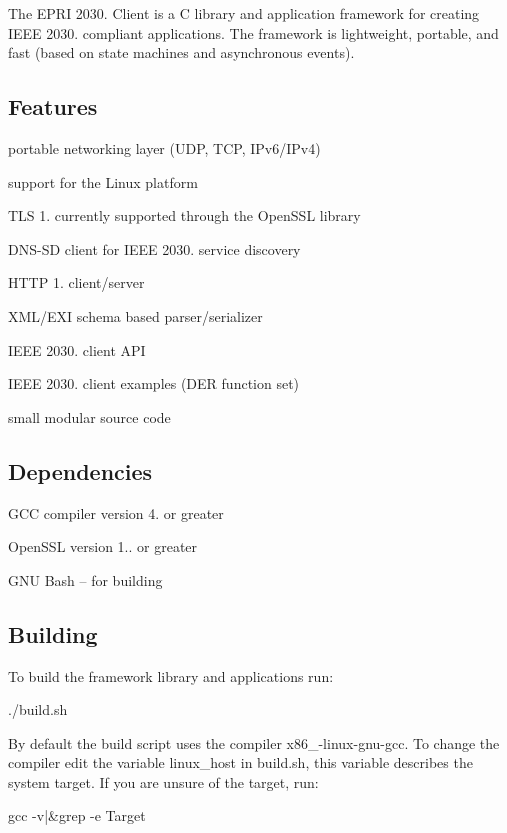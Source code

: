 The E\+P\+RI 2030. Client is a C library and application framework for creating I\+E\+EE 2030. compliant applications. The framework is lightweight, portable, and fast (based on state machines and asynchronous events).

\subsection*{Features }


\begin{DoxyItemize}
\item portable networking layer (U\+DP, T\+CP, I\+Pv6/\+I\+Pv4)
\item support for the Linux platform
\item T\+LS 1. currently supported through the Open\+S\+SL library
\item D\+N\+S-\/\+SD client for I\+E\+EE 2030. service discovery
\item H\+T\+TP 1. client/server
\item X\+M\+L/\+E\+XI schema based parser/serializer
\item I\+E\+EE 2030. client A\+PI
\item I\+E\+EE 2030. client examples (D\+ER function set)
\item small modular source code
\end{DoxyItemize}

\subsection*{Dependencies }


\begin{DoxyItemize}
\item G\+CC compiler version 4. or greater
\item Open\+S\+SL version 1.. or greater
\item G\+NU Bash -- for building
\end{DoxyItemize}

\subsection*{Building }

To build the framework library and applications run\+: \begin{DoxyVerb}./build.sh
\end{DoxyVerb}


By default the build script uses the compiler {\ttfamily x86\+\_-\/linux-\/gnu-\/gcc}. To change the compiler edit the variable {\ttfamily linux\+\_\+host} in {\ttfamily build.\+sh}, this variable describes the system target. If you are unsure of the target, run\+: \begin{DoxyVerb}gcc -v|&grep -e Target
\end{DoxyVerb}


